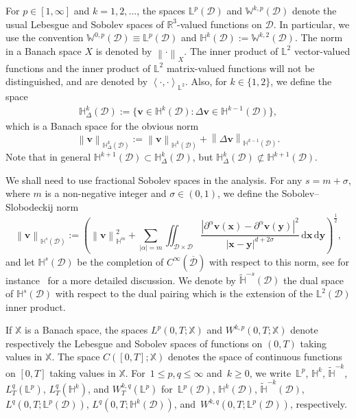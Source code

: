 \documentclass[11pt,reqno]{amsart}
\theoremstyle{definition}
\numberwithin{equation}{section}
\newcommand{\bff}{\boldsymbol}
\newcommand{\bb}{\mathbb}
\newcommand{\dx}{\mathrm{d}\bff{x}}
\newcommand{\dy}{\mathrm{d}\bff{y}}
\newcommand{\norm}[2]{\left\|{#1}\right\|_{#2}}
\newcommand{\inpro}[2]{\left\langle#1,#2\right\rangle}
\begin{document}
For $p\in [1,\infty]$ and $k=1,2,\ldots$, the spaces $\bb{L}^p(\mathscr{D})$ and $\bb{W}^{k,p}(\mathscr{D})$ denote the usual Lebesgue and Sobolev spaces of $\bb{R}^3$-valued functions on $\mathscr{D}$. In particular, we use the convention $\bb{W}^{0,p}(\mathscr{D})\equiv \bb{L}^p(\mathscr{D})$ and $\bb{H}^k(\mathscr{D}):= \bb{W}^{k,2}(\mathscr{D})$. The norm in a Banach space $X$ is denoted by $\norm{\cdot}{X}$. The inner product of $\bb{L}^2$ vector-valued functions and the inner product of $\bb{L}^2$ matrix-valued functions will not be distinguished, and are denoted by $\inpro{\cdot}{\cdot}_{\bb{L}^2}$. Also, for $k\in \{1,2\}$, we define the space
\begin{align}\label{equ:Hk Delta}
	\bb{H}^k_{\Delta}(\mathscr{D}) := \big\{\bff{v}\in \bb{H}^k(\mathscr{D}): \Delta \bff{v}\in \bb{H}^{k-1}(\mathscr{D}) \big\},
\end{align}
which is a Banach space for the obvious norm 
\begin{equation}\label{equ:norm Hk Delta}
	\norm{\bff{v}}{\bb{H}^{k}_{\Delta}(\mathscr{D})} := \norm{\bff{v}}{\bb{H}^{k}(\mathscr{D})} + \norm{\Delta \bff{v}}{\bb{H}^{k-1}(\mathscr{D})}.
\end{equation}
Note that in general $\bb{H}^{k+1}(\mathscr{D}) \subset \bb{H}^k_\Delta(\mathscr{D})$, but $\bb{H}^k_\Delta(\mathscr{D}) \not\subset \bb{H}^{k+1}(\mathscr{D})$.

We shall need to use fractional Sobolev spaces in the analysis. For any $s=m+\sigma$, where $m$ is a non-negative integer and $\sigma\in (0,1)$, we define the {Sobolev--Slobodeckij} norm
\begin{equation*}
	\norm{\bff{v}}{\bb{H}^s(\mathscr{D})}
	:=
	\left( \norm{\bff{v}}{\bb{H}^m}^2 + \sum_{|\alpha|=m} \iint_{\mathscr{D}\times \mathscr{D}} \frac{|\partial^\alpha \bff{v}(\bff{x})- \partial^\alpha \bff{v}(\bff{y})|^2}{|\bff{x}-\bff{y}|^{d+2\sigma}}\,\dx\, \dy \right)^{\frac12},
\end{equation*}
and let $\bb{H}^s(\mathscr{D})$ be the completion of $C^\infty(\overline{\mathscr{D}})$ with respect to this norm, see for instance~\citep{DiPalVal12, Gri11, SteTra21} for a more detailed discussion. We denote by $\widetilde{\bb{H}}^{-s}(\mathscr{D})$ the dual space of $\bb{H}^s(\mathscr{D})$ with respect to the dual pairing which is the extension of the {$\bb{L}^2(\mathscr{D})$} inner product.

If $\bb{X}$ is a Banach space, the spaces $L^p(0,T;\bb{X})$ and $W^{k,p}(0,T;\bb{X})$ denote
respectively the Lebesgue and Sobolev spaces of functions on $(0,T)$ taking
values in $\bb{X}$. The space $C([0,T];\bb{X})$ denotes the space of continuous functions
on $[0,T]$ taking values in $\bb{X}$.  For~$1\le p,q\le \infty$ and~$k\geq 0$,
we write~$\bb{L}^p$, $\bb{H}^k$, $\widetilde{\bb{H}}^{-k}$, $L^q_T(\bb{L}^p)$, $L^q_T(\bb{H}^k)$, and $W^{k,q}_T(\bb{L}^p)$ for~$\bb{L}^p(\mathscr{D})$, $\bb{H}^k(\mathscr{D})$, $\widetilde{\bb{H}}^{-k}(\mathscr{D})$,
$L^q(0,T;\bb{L}^p(\mathscr{D}))$, $L^q(0,T;\bb{H}^k(\mathscr{D}))$, and~$W^{k,q}(0,T;\bb{L}^p(\mathscr{D}))$, respectively. 
\end{document}
